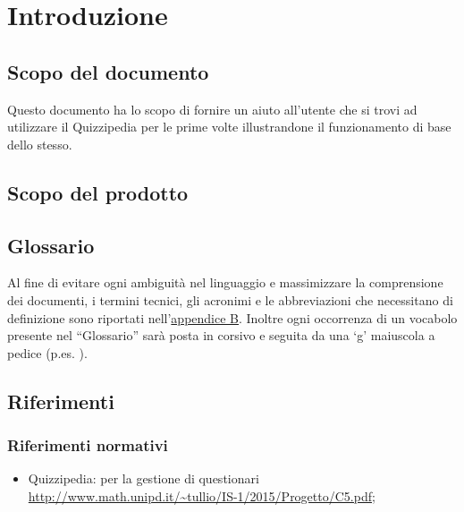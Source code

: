 \documentclass[a4paper, titlepage]{article}
\begin{document}
	
	\pagestyle{fancy}	
	
	\maketitle
	
	
	
	\newpage
	\tableofcontents
	\newpage
	\listoffigures\label{lastromanpage}
	
	\newpage
	\clearpage	
	\hypersetup{linkcolor=blue}
	
	\section{Introduzione}
	\subsection{Scopo del documento}
	Questo documento ha lo scopo di fornire un aiuto all'utente che si trovi ad utilizzare il 
	Quizzipedia per le prime volte illustrandone il funzionamento di base dello stesso.
	
	\subsection{Scopo del prodotto}
	\SCOPO
	
	\subsection{Glossario}
	Al fine di evitare ogni ambiguità nel linguaggio e massimizzare la comprensione dei documenti, i termini tecnici, gli acronimi e le abbreviazioni che necessitano di definizione sono riportati nell'\hyperref[gl]{appendice B}.
	Inoltre ogni occorrenza di un vocabolo presente nel “Glossario” sarà posta in corsivo e seguita da
	una ‘g’ maiuscola a pedice (p.es. ).
	
	\subsection{Riferimenti}	
	\subsubsection{Riferimenti normativi}
	\begin{itemize}
		\item {} Quizzipedia:  per la gestione di questionari \newline \url{http://www.math.unipd.it/~tullio/IS-1/2015/Progetto/C5.pdf};
	\end{itemize}
	\newpage
	
\end{document}
